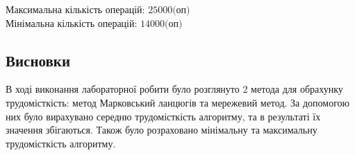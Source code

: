 \noindent
Максимальна кількість операцій: $25000 \text{(оп)}$\\
\noindent
Мінімальна кількість операцій: $14000 \text{(оп)}$

\newpage
\subsection{Висновки}
В ході виконання лабораторної робити було розглянуто 2 метода для обрахунку трудомісткість:
метод Марковський ланцюгів та мережевий метод. За допомогою них було вирахувано середню трудомісткість алгоритму,
та в результаті їх значення збігаються. Також було розраховано мінімальну та максимальну трудомісткість алгоритму.
